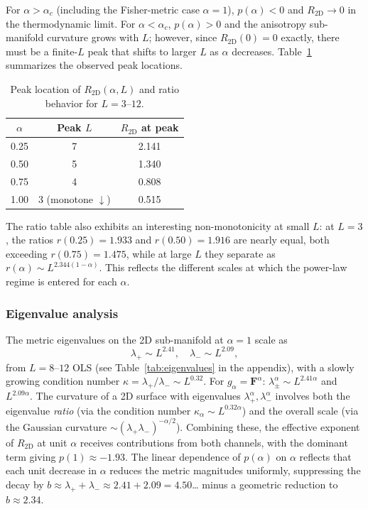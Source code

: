 \documentclass[twocolumn,showpacs,preprintnumbers,amsmath,amssymb,prl]{revtex4-2}
\newcommand{\Fmat}{\mathbf{F}}
\newcommand{\RtwoD}{R_{\mathrm{2D}}}
\newcommand{\alphac}{\alpha_c}
\begin{document}
For $\alpha > \alphac$ (including the Fisher-metric case $\alpha=1$),
$p(\alpha) < 0$ and $\RtwoD \to 0$ in the thermodynamic limit.
For $\alpha < \alphac$, $p(\alpha) > 0$ and the anisotropy sub-manifold
curvature grows with $L$; however, since $\RtwoD(0) = 0$ exactly, there must
be a finite-$L$ peak that shifts to larger $L$ as $\alpha$ decreases.
Table~\ref{tab:peaks} summarizes the observed peak locations.

\begin{table}[h]
\caption{Peak location of $\RtwoD(\alpha, L)$ and ratio behavior
  for $L=3$--$12$.}
\label{tab:peaks}
\begin{ruledtabular}
\begin{tabular}{ccc}
$\alpha$ & Peak $L$ & $\RtwoD$ at peak \\
\hline
0.25  & 7 & 2.141 \\
0.50  & 5 & 1.340 \\
0.75  & 4 & 0.808 \\
1.00  & 3 (monotone $\downarrow$) & 0.515 \\
\end{tabular}
\end{ruledtabular}
\end{table}

The ratio table also exhibits an interesting non-monotonicity at small $L$:
at $L=3$, the ratios $r(0.25) = 1.933$ and $r(0.50) = 1.916$ are nearly equal,
both exceeding $r(0.75) = 1.475$, while at large $L$ they separate as
$r(\alpha) \sim L^{2.344(1-\alpha)}$.
This reflects the different scales at which the power-law regime is entered
for each $\alpha$.

\subsubsection*{Eigenvalue analysis}

The metric eigenvalues on the 2D sub-manifold at $\alpha = 1$ scale as
\begin{equation}
  \lambda_+ \sim L^{2.41}, \quad \lambda_- \sim L^{2.09},
\end{equation}
from $L = 8$--$12$ OLS (see Table~\ref{tab:eigenvalues} in the appendix),
with a slowly growing condition number $\kappa = \lambda_+/\lambda_- \sim L^{0.32}$.
For $g_\alpha = \Fmat^\alpha$: $\lambda_\pm^\alpha \sim L^{2.41\alpha}$ and
$L^{2.09\alpha}$.
The curvature of a 2D surface with eigenvalues $\lambda_+^\alpha, \lambda_-^\alpha$
involves both the eigenvalue \emph{ratio} (via the condition number
$\kappa_\alpha \sim L^{0.32\alpha}$) and the overall scale (via the Gaussian
curvature $\sim (\lambda_+\lambda_-)^{-\alpha/2}$).
Combining these,
the effective exponent of $\RtwoD$ at unit $\alpha$ receives contributions from
both channels, with the dominant term giving $p(1) \approx -1.93$.
The linear dependence of $p(\alpha)$ on $\alpha$ reflects that each unit
decrease in $\alpha$ reduces the metric magnitudes uniformly, suppressing the
decay by $b \approx \lambda_+ + \lambda_- \approx 2.41 + 2.09 = 4.50$\ldots
minus a geometric reduction to $b \approx 2.34$.
\end{document}
